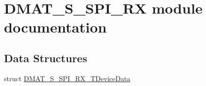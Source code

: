 \hypertarget{group___d_m_a_t___s___s_p_i___r_x__module}{\section{D\-M\-A\-T\-\_\-\-S\-\_\-\-S\-P\-I\-\_\-\-R\-X module documentation}
\label{group___d_m_a_t___s___s_p_i___r_x__module}
}
\subsection*{Data Structures}
\begin{DoxyCompactItemize}
\item 
struct \hyperlink{struct_d_m_a_t___s___s_p_i___r_x___t_device_data}{D\-M\-A\-T\-\_\-\-S\-\_\-\-S\-P\-I\-\_\-\-R\-X\-\_\-\-T\-Device\-Data}
\end{DoxyCompactItemize}
